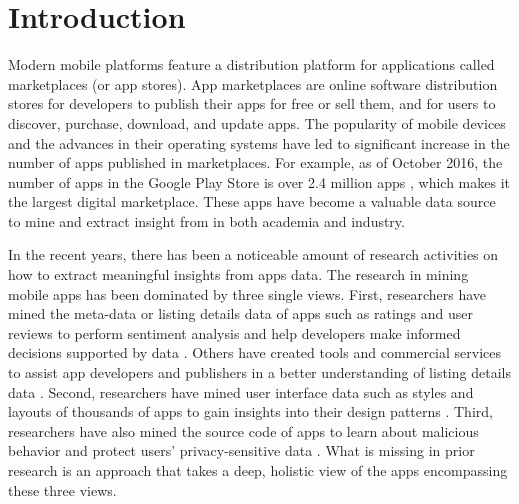 \chapter{Introduction}
\label{ch:intro__chapter}
Modern mobile platforms feature a distribution platform for applications called marketplaces (or app stores).
App marketplaces are online software distribution stores for developers to publish their apps for free or sell them, and for users to discover, purchase, download, and update apps.
The popularity of mobile devices and the advances in their operating systems have led to significant increase in the number of apps published in marketplaces.
For example, as of October 2016, the number of apps in the Google Play Store is over 2.4 million apps \cite{appbrain_play_apps}, which makes it the largest digital marketplace.
These apps have become a valuable data source to mine and extract insight from in both academia and industry.

In the recent years, there has been a noticeable amount of research activities on how to extract meaningful insights from apps data. 
The research in mining mobile apps has been dominated by three single views.
First, researchers have mined the meta-data or listing details data of apps such as ratings and user reviews to perform sentiment analysis and help developers make informed decisions supported by data \cite{fu_2013_KDD,chen_2014_ICSE,kong_2015_CCS}. 
Others have created tools and commercial services to assist app developers and publishers in a better understanding of listing details data \cite{appfigures,applause,appannie}.
Second, researchers have mined user interface data such as styles and layouts of thousands of apps to gain insights into their design patterns \cite{shirazi_EICS_2013,Alharbi_2015_MobileHCI}.
Third, researchers have also mined the source code of apps to learn about malicious behavior and protect users' privacy-sensitive data \cite{zhou_2012_SP_dissecting,lu_2012_CCS,Arzt_2014_PLDI}.
What is missing in prior research is an approach that takes a deep, holistic view of the apps encompassing these three views.

